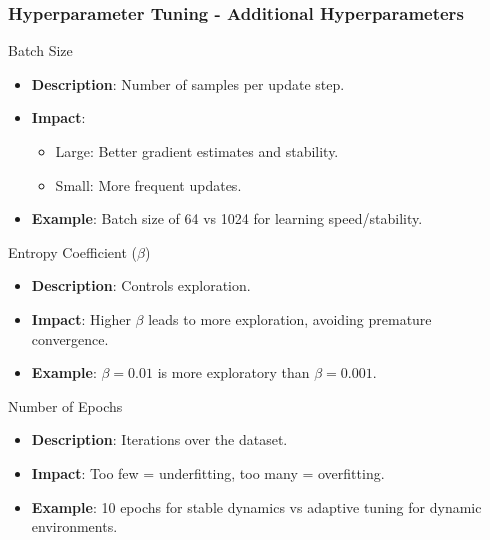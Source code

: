 \documentclass[aspectratio=169]{beamer}
\begin{document}
\begin{frame}[fragile]
    \frametitle{Hyperparameter Tuning - Additional Hyperparameters}
    \begin{block}{Batch Size}
        \begin{itemize}
            \item \textbf{Description}: Number of samples per update step.
            \item \textbf{Impact}:
            \begin{itemize}
                \item Large: Better gradient estimates and stability.
                \item Small: More frequent updates.
            \end{itemize}
            \item \textbf{Example}: Batch size of 64 vs 1024 for learning speed/stability.
        \end{itemize}
    \end{block}
    
    \begin{block}{Entropy Coefficient ($\beta$)}
        \begin{itemize}
            \item \textbf{Description}: Controls exploration.
            \item \textbf{Impact}: Higher $\beta$ leads to more exploration, avoiding premature convergence.
            \item \textbf{Example}: $\beta = 0.01$ is more exploratory than $\beta = 0.001$.
        \end{itemize}
    \end{block}
    
    \begin{block}{Number of Epochs}
        \begin{itemize}
            \item \textbf{Description}: Iterations over the dataset.
            \item \textbf{Impact}: Too few = underfitting, too many = overfitting.
            \item \textbf{Example}: 10 epochs for stable dynamics vs adaptive tuning for dynamic environments.
        \end{itemize}
    \end{block}
\end{frame}
\end{document}
